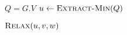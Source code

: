 
\begin{algorithm}[H]
  \begin{algorithmic}[1]
      \State {}

      \hStatex
      \State $Q = G.V$
	\State \textcolor<2->{purple}{$u \gets \Call{Extract-Min}{Q}$}

	\hStatex
	  \State $\Call{Relax}{u,v,w}$
	\EndFor
      \EndWhile
    \EndProcedure
  \end{algorithmic}
\end{algorithm}

